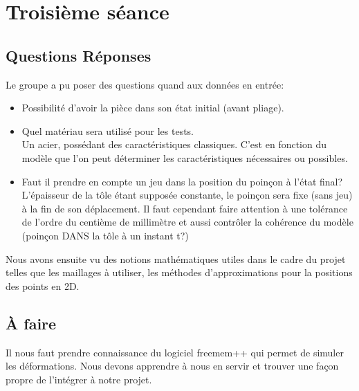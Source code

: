 \section{Troisième séance}

\subsection{Questions Réponses}

Le groupe a pu poser des questions quand aux données en entrée:
\begin{itemize}
    \item Possibilité d'avoir la pièce dans son état initial (avant pliage).\\

    \item Quel matériau sera utilisé pour les tests.\\
        Un acier, possédant des caractéristiques  classiques.
        C'est en fonction du modèle que l'on peut déterminer les caractéristiques nécessaires ou possibles.
    \item Faut il prendre en compte un jeu dans la position du poinçon à l'état final?\\
        L'épaisseur de la tôle étant supposée constante, le poinçon sera fixe (sans jeu) à la fin de son déplacement.
        Il faut cependant faire attention à une tolérance de l'ordre du centième de millimètre et aussi contrôler la cohérence du modèle (poinçon DANS la tôle à un instant t?)
\end{itemize}

Nous avons ensuite vu des notions mathématiques utiles dans le cadre du projet telles que les maillages à utiliser, les méthodes d'approximations pour la positions des points en 2D.

\subsection{À faire}
Il nous faut prendre connaissance du logiciel freemem++ qui permet de simuler les déformations.
Nous devons apprendre à nous en servir et trouver une façon propre de l'intégrer à notre projet.

